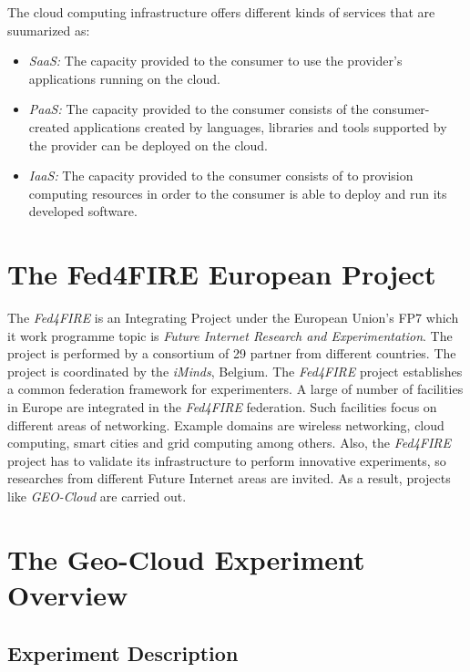 The cloud computing infrastructure offers different kinds of services that are
suumarized as:

\begin{itemize}
\item \emph{\ac{SaaS}:} The capacity provided to the consumer
  to use   the provider's applications running on the cloud.
\item \emph{\ac{PaaS}:} The capacity provided to the consumer
  consists of the consumer-created applications created by languages, libraries
  and tools supported by the provider can be deployed on the cloud.
\item \emph{\ac{IaaS}:} The capacity provided to the
  consumer consists of to provision computing resources in order to the consumer
  is able to deploy and run its developed software.
\end{itemize} 



\section{The Fed4FIRE European Project}%
The \emph{Fed4FIRE} is an Integrating Project under the European Union's \ac{FP7} which it work programme topic is \emph{Future
  Internet Research and Experimentation}. The project is performed by a
consortium of 29 partner from different countries. The project is coordinated by
the \emph{iMinds}, Belgium. 
The \emph{Fed4FIRE} project establishes a common federation framework for
experimenters. A large of number of facilities in Europe are integrated in the
\emph{Fed4FIRE} federation. Such facilities focus on different  areas
of networking. Example domains are wireless networking, cloud computing, smart
cities and grid computing among others.
Also, the \emph{Fed4FIRE} project has to validate its infrastructure to perform
innovative experiments, so researches from different Future Internet areas
are invited. As a result, projects like \emph{GEO-Cloud} are carried out.

\section{The Geo-Cloud Experiment Overview}


\subsection{Experiment Description}

